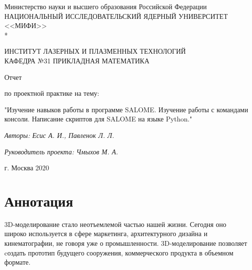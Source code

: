\documentclass[a4paper,12pt]{article}
\theoremstyle{plain} %
\theoremstyle{definition} %
\theoremstyle{remark} %
\begin{document}
		\renewcommand{\contentsname}{\Large Содержание}
		\renewcommand{\bibname}{\normalfont\Large\bfseries Список литературы}
		
		\begin{titlepage}
			\begin{center}
				Министерство науки и высшего образования Российской Федерации \\
				НАЦИОНАЛЬНЫЙ ИССЛЕДОВАТЕЛЬСКИЙ ЯДЕРНЫЙ УНИВЕРСИТЕТ <<МИФИ>> \\*
				\hrulefill
			\end{center}
		
		\begin{center}
			ИНСТИТУТ ЛАЗЕРНЫХ И ПЛАЗМЕННЫХ ТЕХНОЛОГИЙ\\
			КАФЕДРА №31 ПРИКЛАДНАЯ МАТЕМАТИКА
		\end{center}
		\vspace{1cm}
		
		\vspace{2em}
		
		\begin{center}
			\large{Отчет}
			
			по проектной практике на тему:
		\end{center}
		
		\begin{center}
			\large "Изучение навыков работы в программе SALOME. Изучение работы с командами консоли. Написание скриптов для SALOME на языке Python."
	

		\textit{Авторы: Есис А. И., Павленок Л. Л.}
		
		\textit{Руководитель проекта: Чмыхов М. А.}
		\end{center}
	
	

\vspace{26em}
		
		\begin{center}
			г. Москва 2020
		\end{center}
	\end{titlepage}

	\newpage 
	\tableofcontents
	\setcounter{page}{3}
	
	\newpage
	\section*{Аннотация}
	
	3D-моделирование стало неотъемлемой частью нашей жизни. Сегодня оно широко используется в сфере маркетинга, архитектурного дизайна и кинематографии, не говоря уже о промышленности. 3D-моделирование позволяет cоздать прототип будущего сооружения, коммерческого продукта в объемном формате.
	
\end{document}
